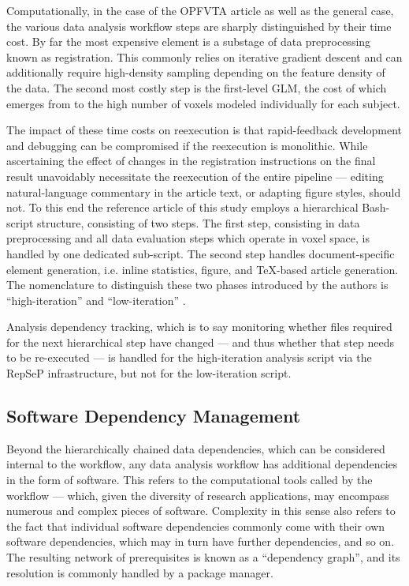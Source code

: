 
Computationally, in the case of the OPFVTA article as well as the general case, the various data analysis workflow steps are sharply distinguished by their time cost.
By far the most expensive element is a substage of data preprocessing known as registration.
This commonly relies on iterative gradient descent and can additionally require high-density sampling depending on the feature density of the data.
The second most costly step is the first-level GLM, the cost of which emerges from to the high number of voxels modeled individually for each subject.

The impact of these time costs on reexecution is that rapid-feedback development and debugging can be compromised if the reexecution is monolithic.
While ascertaining the effect of changes in the registration instructions on the final result unavoidably necessitate the reexecution of the entire pipeline — editing natural-language commentary in the article text, or adapting figure styles, should not.
To this end the reference article of this study employs a hierarchical Bash-script structure, consisting of two steps.
The first step, consisting in data preprocessing and all data evaluation steps which operate in voxel space, is handled by one dedicated sub-script.
The second step handles document-specific element generation, i.e. inline statistics, figure, and TeX-based article generation.
The nomenclature to distinguish these two phases introduced by the authors is “high-iteration” and “low-iteration” \cite{repsep}.

Analysis dependency tracking, which is to say monitoring whether files required for the next hierarchical step have changed — and thus whether that step needs to be re-executed — is handled for the high-iteration analysis script via the RepSeP infrastructure, but not for the low-iteration script.


\subsection{Software Dependency Management}

Beyond the hierarchically chained data dependencies, which can be considered internal to the workflow, any data analysis workflow has additional dependencies in the form of software.
This refers to the computational tools called by the workflow — which, given the diversity of research applications, may encompass numerous and complex pieces of software.
Complexity in this sense also refers to the fact that individual software dependencies commonly come with their own software dependencies, which may in turn have further dependencies, and so on.
The resulting network of prerequisites is known as a “dependency graph”, and its resolution is commonly handled by a package manager.

